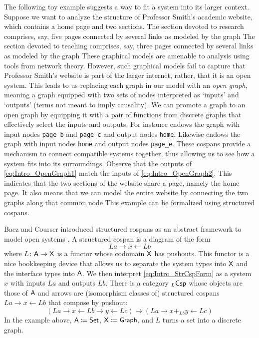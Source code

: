 \documentclass[oneside]{amsart}
\begin{document}
The following toy example suggests a way to fit a system
into its larger context. Suppose we want to analyze the
structure of Professor Smith's academic website, which
contains a home page and two sections. The section devoted
to research comprises, say, five pages connected by several
links as modeled by the graph
 The section devoted to
teaching comprises, say, three pages connected by several
links as modeled by the graph
 These graphical models
are amenable to analysis using tools from network
theory. However, such graphical models fail to capture that
Professor Smith's website is part of the larger internet,
rather, that it is an open system. This leads to us
replacing each graph in our model with an \emph{open graph},
meaning a graph equipped with two sets of nodes interpreted
as `inputs' and `outputs' (terms not meant to imply
causality). We can promote a graph to an open graph by
equipping it with a pair of functions from discrete graphs
that effectively select the inputs and outputs. For instance
 endows the graph with
input nodes \texttt{page b} and \texttt{page c} and output
nodes \texttt{home}. Likewise
 endows the graph with
input nodes \texttt{home} and output nodes \texttt{page\_e}.
These cospans provide a mechanism to connect compatible
systems together, thus allowing us to see how a system fits
into its surroundings. Observe that the outputs of
\eqref{eq:Intro_OpenGraph1} match the inputs of
\eqref{eq:Intro_OpenGraph2}. This indicates that the two
sections of the website share a page, namely the home page.
It also means that we can model the entire website by
connecting the two graphs along that common node
 This example can be
formalized using structured cospans.

Baez and Courser introduced structured cospans as
an abstract framework to model open systems
\parencite{bc_strCsp}. A structured cospan is a diagram
of the form
\begin{equation}\label{eq:Intro_StrCspForm}
  La \to x \gets Lb
\end{equation}
where $ L \colon \mathsf{A} \to \mathsf{X} $ is a functor whose
codomain $ \mathsf{X} $ has pushouts. This functor is a
nice bookkeeping device that allows us to separate
the system types into $ \mathsf{X} $ and the interface
types into $ \mathsf{A} $.  We then interpret
\eqref{eq:Intro_StrCspForm} as a system $ x $ with
inputs $ La $ and outputs $ Lb $. There is a
category $ _L\mathsf{Csp} $ whose objects are those of
$ \mathsf{A} $ and arrows are (isomorphism classes of) structured cospans
$ La \to x \gets Lb $ that compose by pushout:
$$(La \to x \gets Lb \to y \gets Lc) \mapsto (La \to x +_{Lb}y
\gets Lc)$$ In the example above,
$ \mathsf{A} \coloneqq \mathsf{Set} $, $ \mathsf{X} \coloneqq \mathsf{Graph} $, and
$ L $ turns a set into a discrete graph.
\end{document}
